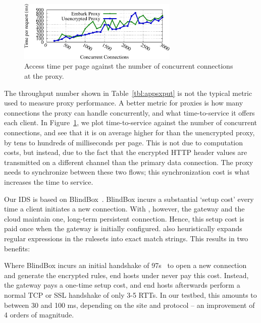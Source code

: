 \begin{figure}[t]
\centering
\includegraphics[width=3in]{fig/proxytime}
\caption{\label{fig:proxygraph} Access time per page against the number of concurrent connections at the proxy.}
\end{figure}

 The throughput number shown in Table~\ref{tbl:appsxput} is not the typical metric used to measure proxy performance. A better metric for proxies is how many connections the proxy can handle concurrently, and what time-to-service it offers each client. In Figure~\ref{fig:proxygraph}, we plot time-to-service against the number of concurrent connections, and see that it is on average higher for \sys than the unencrypted proxy, by tens to hundreds of milliseconds per page.
This is not due to computation costs, but instead, due to the fact that the encrypted HTTP header values are transmitted on a different channel than the primary data connection.
The \sys proxy needs to synchronize between these two flows; this synchronization cost is what increases the time to service. 


Our IDS is based on BlindBox~\cite{blindbox}. BlindBox incurs a substantial `setup cost' every time a client initiates a new connection. With \sys, however, the gateway and the cloud maintain one, long-term persistent connection. 
Hence, this setup cost is paid once when the gateway is initially configured. \sys also heuristically expands regular expressions in the rulesets into exact match strings. This results in two benefits:

 Where BlindBox incurs an initial handshake of 97s~\cite{blindbox} to open a new connection and generate the encrypted rules, end hosts under \sys never pay this cost. Instead, the gateway pays a one-time setup cost, and end hosts afterwards perform a normal TCP or SSL handshake of only 3-5 RTTs. In our testbed, this amounts to between 30 and 100 ms, depending on the site and protocol -- an improvement of 4 orders of magnitude.  

